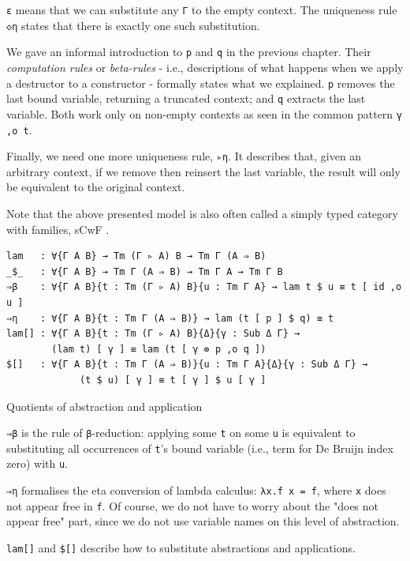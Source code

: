 \verb$ε$ means that we can substitute any \verb$Γ$ to the empty context. The uniqueness rule \verb$◇η$ states that there is exactly one such substitution.

We gave an informal introduction to \verb$p$ and \verb$q$ in the previous chapter. Their \textit{computation rules} or \textit{beta-rules} - i.e., descriptions of what happens when we apply a destructor to a constructor - formally states what we explained. \verb$p$ removes the last bound variable, returning a truncated context; and \verb$q$ extracts the last variable. Both work only on non-empty contexts as seen in the common pattern \verb$γ ,o t$.

Finally, we need one more uniqueness rule, \verb$▹η$. It describes that, given an arbitrary context, if we remove then reinsert the last variable, the result will only be equivalent to the original context.

Note that the above presented model is also often called a simply typed category with families, sCwF \cite{castellan2021categories}.

\begin{listing}[H]
\begin{verbatim}
lam   : ∀{Γ A B} → Tm (Γ ▹ A) B → Tm Γ (A ⇒ B)
_$_   : ∀{Γ A B} → Tm Γ (A ⇒ B) → Tm Γ A → Tm Γ B
⇒β    : ∀{Γ A B}{t : Tm (Γ ▹ A) B}{u : Tm Γ A} → lam t $ u ≡ t [ id ,o u ]
⇒η    : ∀{Γ A B}{t : Tm Γ (A ⇒ B)} → lam (t [ p ] $ q) ≡ t
lam[] : ∀{Γ A B}{t : Tm (Γ ▹ A) B}{Δ}{γ : Sub Δ Γ} →
        (lam t) [ γ ] ≡ lam (t [ γ ⊚ p ,o q ])
$[]   : ∀{Γ A B}{t : Tm Γ (A ⇒ B)}{u : Tm Γ A}{Δ}{γ : Sub Δ Γ} →
             (t $ u) [ γ ] ≡ t [ γ ] $ u [ γ ]
\end{verbatim}
\caption{Quotients of abstraction and application}
\label{code:ot-functions}
\end{listing}

\verb$⇒β$ is the rule of \verb$β$-reduction: applying some \verb$t$ on some \verb$u$ is equivalent to substituting all occurrences of \verb$t$'s bound variable (i.e., term for De Bruijn index zero) with \verb$u$.

\verb$⇒η$ formalises the eta conversion of lambda calculus: \verb$λx.f x = f$, where \verb$x$ does not appear free in \verb$f$. Of course, we do not have to worry about the "does not appear free" part, since we do not use variable names on this level of abstraction.

\verb$lam[]$ and \verb$$\verb=$=\verb$[]$\verb$$ describe how to substitute abstractions and applications.

